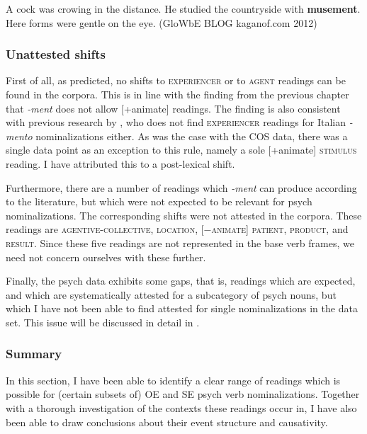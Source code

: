 \begin{exe}
	\ex \label{ex:psy-resultstate-muse}
 	A cock was crowing in the distance. He studied the countryside with \textbf{musement}. Here forms were gentle on the eye. {\small(\acs{GloWbE} BLOG kaganof.com 2012)} 
\end{exe}

\subsubsection{Unattested shifts}
\label{sec:psy-output-survey-unatt}

First of all, as predicted, no shifts to \textsc{experiencer} or to \textsc{agent} readings can be found in the corpora. This is in line with the finding from the previous chapter that \textit{-ment} does not allow [+animate] readings. The finding is also consistent with previous research by \citet{Melloni.2011}, who does not find \textsc{experiencer} readings for Italian \textit{-mento} nominalizations either. As was the case with the COS data, there was a single data point as an exception to this rule, namely a sole [+animate] \textsc{stimulus} reading. I have attributed this to a post-lexical shift.

Furthermore, there are a number of readings which \textit{-ment} can produce according to the literature, but which were not expected to be relevant for psych nominalizations. The corresponding shifts were not attested in the corpora. These readings are \textsc{agentive-collective, location, [−animate] patient, product,} and \textsc{result}. Since these five readings are not represented in the base verb frames, we need not concern ourselves with these further. 

Finally, the psych data exhibits some gaps, that is, readings which are expected, and which are systematically attested for a subcategory of psych nouns, but which I have not been able to find attested for single nominalizations in the data set. This issue will be discussed in detail in .

\subsubsection{Summary}
\label{sec:psy-output-survey-sum}

In this section, I have been able to identify a clear range of readings which is possible for (certain subsets of) OE and SE psych verb nominalizations. Together with a thorough investigation of the contexts these readings occur in, I have also been able to draw conclusions about their event structure and causativity.

